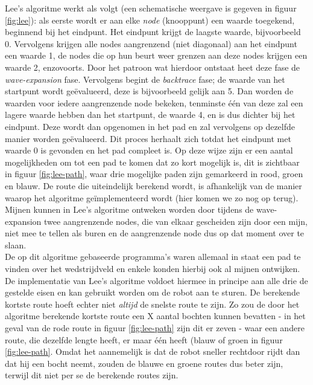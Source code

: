 \documentclass{report}
\begin{document}
Lee's algoritme werkt als volgt (een schematische weergave is gegeven in figuur \ref{fig:lee}): als eerste wordt er aan elke \textit{node} (knooppunt) een waarde toegekend, beginnend bij het eindpunt.
Het eindpunt krijgt de laagste waarde, bijvoorbeeld 0.
Vervolgens krijgen alle nodes aangrenzend (niet diagonaal) aan het eindpunt een waarde 1, de nodes die op hun beurt weer grenzen aan deze nodes krijgen een waarde 2, enzovoorts.
Door het patroon wat hierdoor ontstaat heet deze fase de \textit{wave-expansion} fase.
Vervolgens begint de \textit{backtrace} fase; de waarde van het startpunt wordt geëvalueerd, deze is bijvoorbeeld gelijk aan 5.
Dan worden de waarden voor iedere aangrenzende node bekeken, tenminste één van deze zal een lagere waarde hebben dan het startpunt, de waarde 4, en is dus dichter bij het eindpunt.
Deze wordt dan opgenomen in het pad en zal vervolgens op dezelfde manier worden geëvalueerd.
Dit proces herhaalt zich totdat het eindpunt met waarde 0 is gevonden en het pad compleet is.
Op deze wijze zijn er een aantal mogelijkheden om tot een pad te komen dat zo kort mogelijk is, dit is zichtbaar in figuur \ref{fig:lee-path}, waar drie mogelijke paden zijn gemarkeerd in rood, groen en blauw.
De route die uiteindelijk berekend wordt, is afhankelijk van de manier waarop het algoritme geïmplementeerd wordt (hier komen we zo nog op terug).
Mijnen kunnen in Lee's algoritme ontweken worden door tijdens de wave-expansion twee aangrenzende nodes, die van elkaar gescheiden zijn door een mijn, niet mee te tellen als buren en de aangrenzende node dus op dat moment over te slaan.
\\

De op dit algoritme gebaseerde programma's waren allemaal in staat een pad te vinden over het wedstrijdveld en enkele konden hierbij ook al mijnen ontwijken.
De implementatie van Lee's algoritme voldoet hiermee in principe aan alle drie de gestelde eisen en kan gebruikt worden om de robot aan te sturen.
De berekende kortste route hoeft echter niet \textit{altijd} de snelste route te zijn.
Zo zou de door het algoritme berekende kortste route een X aantal bochten kunnen bevatten - in het geval van de rode route in figuur \ref{fig:lee-path} zijn dit er zeven -  waar een andere route, die dezelfde lengte heeft, er maar één heeft (blauw of groen in figuur \ref{fig:lee-path}.
Omdat het aannemelijk is dat de robot sneller rechtdoor rijdt dan dat hij een bocht neemt, zouden de blauwe en groene routes dus beter zijn, terwijl dit niet per se de berekende routes zijn.
\end{document}
